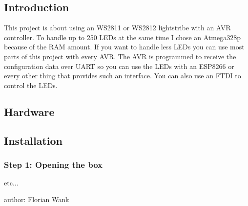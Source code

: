  \hypertarget{index_intro_sec}{}\subsection{Introduction}\label{index_intro_sec}
This project is about using an W\+S2811 or W\+S2812 lightstribe with an A\+V\+R controller. To handle up to 250 L\+E\+Ds at the same time I chose an Atmega328p because of the R\+A\+M amount. If you want to handle less L\+E\+Ds you can use most parts of this project with every A\+V\+R. The A\+V\+R is programmed to receive the configuration data over U\+A\+R\+T so you can use the L\+E\+Ds with an E\+S\+P8266 or every other thing that provides such an interface. You can also use an F\+T\+D\+I to control the L\+E\+Ds.\hypertarget{index_hardware_sec}{}\subsection{Hardware}\label{index_hardware_sec}
 \hypertarget{index_install_sec}{}\subsection{Installation}\label{index_install_sec}
\hypertarget{index_step1}{}\subsubsection{Step 1\+: Opening the box}\label{index_step1}
etc...

author\+: Florian Wank 